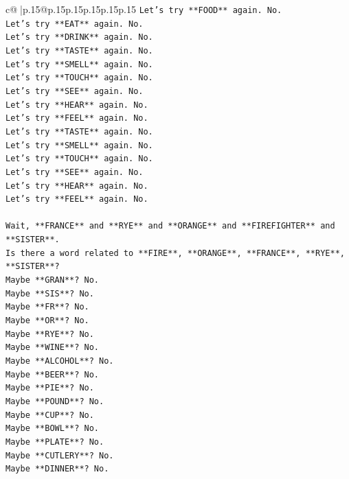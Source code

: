 \documentclass{article}
\begin{document}
{\begin{supertabular}{c@{$\;$}|p{.15\linewidth}@{}p{.15\linewidth}p{.15\linewidth}p{.15\linewidth}p{.15\linewidth}p{.15\linewidth}}
{{{\texttt{Let's try **FOOD** again. No.} \\
\texttt{Let's try **EAT** again. No.} \\
\texttt{Let's try **DRINK** again. No.} \\
\texttt{Let's try **TASTE** again. No.} \\
\texttt{Let's try **SMELL** again. No.} \\
\texttt{Let's try **TOUCH** again. No.} \\
\texttt{Let's try **SEE** again. No.} \\
\texttt{Let's try **HEAR** again. No.} \\
\texttt{Let's try **FEEL** again. No.} \\
\texttt{Let's try **TASTE** again. No.} \\
\texttt{Let's try **SMELL** again. No.} \\
\texttt{Let's try **TOUCH** again. No.} \\
\texttt{Let's try **SEE** again. No.} \\
\texttt{Let's try **HEAR** again. No.} \\
\texttt{Let's try **FEEL** again. No.} \\
\\ 
\texttt{Wait, **FRANCE** and **RYE** and **ORANGE** and **FIREFIGHTER** and **SISTER**.} \\
\texttt{Is there a word related to **FIRE**, **ORANGE**, **FRANCE**, **RYE**, **SISTER**?} \\
\texttt{Maybe **GRAN**? No.} \\
\texttt{Maybe **SIS**? No.} \\
\texttt{Maybe **FR**? No.} \\
\texttt{Maybe **OR**? No.} \\
\texttt{Maybe **RYE**? No.} \\
\texttt{Maybe **WINE**? No.} \\
\texttt{Maybe **ALCOHOL**? No.} \\
\texttt{Maybe **BEER**? No.} \\
\texttt{Maybe **PIE**? No.} \\
\texttt{Maybe **POUND**? No.} \\
\texttt{Maybe **CUP**? No.} \\
\texttt{Maybe **BOWL**? No.} \\
\texttt{Maybe **PLATE**? No.} \\
\texttt{Maybe **CUTLERY**? No.} \\
\texttt{Maybe **DINNER**? No.} \\
}}}
\end{supertabular}}
\end{document}
